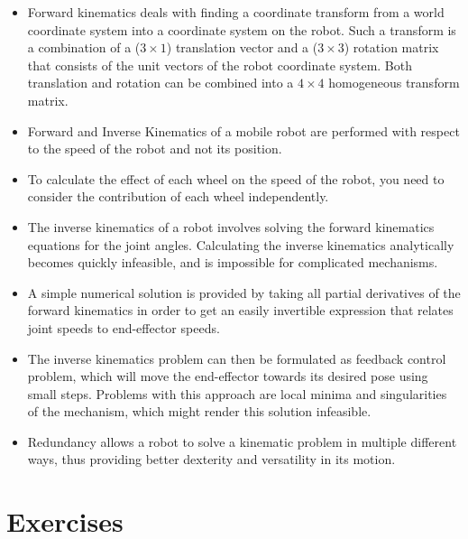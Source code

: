 \begin{itemize}
\item Forward kinematics deals with finding a coordinate transform from a world coordinate system into a coordinate system on the robot.
Such a transform is a combination of a ($3\times1$) translation vector and a ($3\times3$) rotation matrix that consists of the unit vectors of the robot coordinate system. Both translation and rotation can be combined into a $4\times4$ homogeneous transform matrix.
\item Forward and Inverse Kinematics of a mobile robot are performed with respect to the speed of the robot and not its position.
\item To calculate the effect of each wheel on the speed of the robot, you need to consider the contribution of each wheel independently.
\item The inverse kinematics of a robot involves solving the forward kinematics equations for the joint angles.
Calculating the inverse kinematics analytically becomes quickly infeasible, and is impossible for complicated mechanisms.
\item A simple numerical solution is provided by taking all partial derivatives of the forward kinematics in order to get an easily invertible expression that relates joint speeds to end-effector speeds.
\item The inverse kinematics problem can then be formulated as feedback control problem, which will move the end-effector towards its desired pose using small steps. Problems with this approach are local minima and singularities of the mechanism, which might render this solution infeasible.
\item Redundancy allows a robot to solve a kinematic problem in multiple different ways, thus providing better dexterity and versatility in its motion.
\end{itemize}

\section*{Exercises}\small
